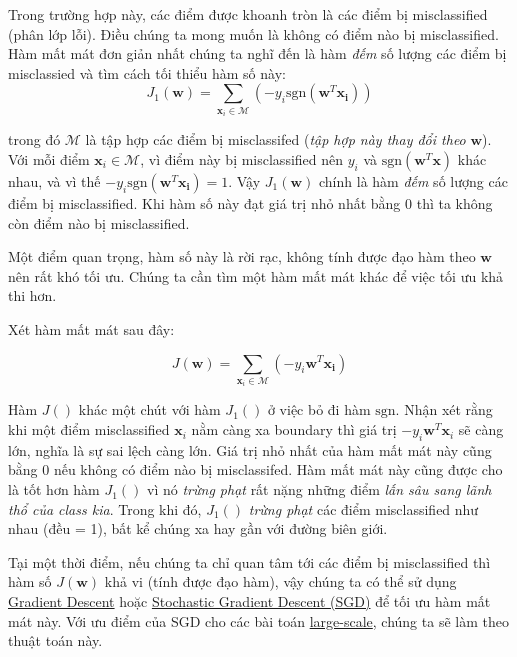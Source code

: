  
Trong trường hợp này, các điểm được khoanh tròn là các điểm bị misclassified (phân lớp lỗi). Điều chúng ta mong muốn là không có điểm nào bị misclassified. Hàm mất mát đơn giản nhất chúng ta nghĩ đến là hàm \textit{đếm} số lượng các điểm bị misclassied và tìm cách tối thiểu hàm số này: 
\begin{equation} 
    J_1(\mathbf{w}) = \sum_{\mathbf{x}_i \in \mathcal{M}} (-y_i\text{sgn}(\mathbf{w}^T\mathbf{x_i})) 
\end{equation} 
 
trong đó $\mathcal{M}$ là tập hợp các điểm bị misclassifed (\textit{tập hợp này thay đổi theo} $\mathbf{w}$). Với mỗi điểm $\mathbf{x}_i \in \mathcal{M}$, vì điểm này bị misclassified nên $y_i$ và $\text{sgn}(\mathbf{w}^T\mathbf{x})$ khác nhau, và vì thế $-y_i\text{sgn}(\mathbf{w}^T\mathbf{x_i}) = 1 $. Vậy $J_1(\mathbf{w})$ chính là hàm \textit{đếm} số lượng các điểm bị misclassified. Khi hàm số này đạt giá trị nhỏ nhất bằng 0 thì ta không còn điểm nào bị misclassified.  
 
Một điểm quan trọng, hàm số này là rời rạc, không tính được đạo hàm theo $\mathbf{w}$ nên rất khó tối ưu. Chúng ta cần tìm một hàm mất mát khác để việc tối ưu khả thi hơn. 
 
Xét hàm mất mát sau đây:  
 
\begin{equation} 
    J(\mathbf{w}) = \sum_{\mathbf{x}_i \in \mathcal{M}} (-y_i\mathbf{w}^T\mathbf{x_i}) 
\end{equation} 
 
Hàm $J()$ khác một chút với hàm $J_1()$ ở việc bỏ đi hàm $\text{sgn}$. Nhận xét rằng khi một điểm misclassified $\mathbf{x}_i$ nằm càng xa boundary thì giá trị $-y_i\mathbf{w}^T\mathbf{x}_i$ sẽ càng lớn, nghĩa là sự sai lệch càng lớn. Giá trị nhỏ nhất của hàm mất mát này cũng bằng 0 nếu không có điểm nào bị misclassifed. Hàm mất mát này cũng được cho là tốt hơn hàm $J_1()$ vì nó \textit{trừng phạt} rất nặng những điểm \textit{lấn sâu sang lãnh thổ của class kia}. Trong khi đó, $J_1()$ \textit{trừng phạt} các điểm misclassified như nhau (đều = 1), bất kể chúng xa hay gần với đường biên giới. 
 
Tại một thời điểm, nếu chúng ta chỉ quan tâm tới các điểm bị misclassified thì hàm số $J(\mathbf{w})$ khả vi (tính được đạo hàm), vậy chúng ta có thể sử dụng \href{http://machinelearningcoban.com/2017/01/12/gradientdescent/}{Gradient Descent} hoặc \href{http://machinelearningcoban.com/2017/01/16/gradientdescent2/#-stochastic-gradient-descent}{Stochastic Gradient Descent (SGD)} để tối ưu hàm mất mát này. Với ưu điểm của SGD cho các bài toán \href{http://machinelearningcoban.com/2017/01/12/gradientdescent/#large-scale}{large-scale}, chúng ta sẽ làm theo thuật toán này.  
 
